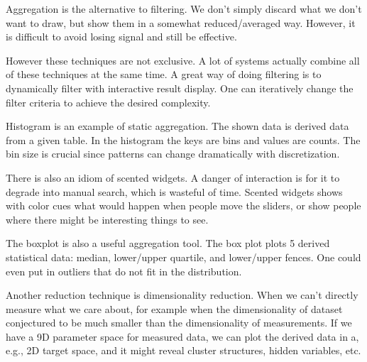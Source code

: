 \documentclass[letterpaper, 11pt]{article}
\numberwithin{equation}{section}
\numberwithin{figure}{section}
\begin{document}
Aggregation is the alternative to filtering. We don't simply discard what we
don't want to draw, but show them in a somewhat reduced/averaged way. However,
it is difficult to avoid losing signal and still be effective.

However these techniques are not exclusive. A lot of systems actually combine
all of these techniques at the same time. A great way of doing filtering is to
dynamically filter with interactive result display. One can iteratively change
the filter criteria to achieve the desired complexity.

Histogram is an example of static aggregation. The shown data is derived data
from a given table. In the histogram the keys are bins and values are counts.
The bin size is crucial since patterns can change dramatically with
discretization.

There is also an idiom of scented widgets. A danger of interaction is for it to
degrade into manual search, which is wasteful of time. Scented widgets shows
with color cues what would happen when people move the sliders, or show people
where there might be interesting things to see.

The boxplot is also a useful aggregation tool. The box plot plots 5 derived
statistical data: median, lower/upper quartile, and lower/upper fences. One
could even put in outliers that do not fit in the distribution.

Another reduction technique is dimensionality reduction. When we can't directly
measure what we care about, for example when the dimensionality of dataset
conjectured to be much smaller than the dimensionality of measurements. If we
have a 9D parameter space for measured data, we can plot the derived data in a,
e.g., 2D target space, and it might reveal cluster structures, hidden variables,
etc.
\end{document}
